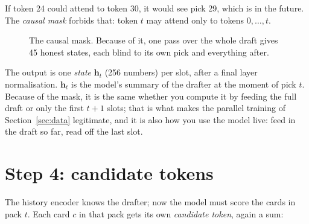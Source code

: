 \documentclass[11pt,letterpaper]{article}
\begin{document}
If token 24 could attend to token 30, it would see pick 29, which is in the future. The \emph{causal
mask} forbids that: token $t$ may attend only to tokens $0,\dots,t$.

\begin{figure}[!htbp]
\centering
{}
\caption{The causal mask. Because of it, one pass over the whole draft gives 45 honest states, each
blind to its own pick and everything after.}
\label{fig:mask}
\end{figure}

The output is one \emph{state} $\mathbf{h}_t$ (256 numbers) per slot, after a final layer normalisation.
$\mathbf{h}_t$ is the model's summary of the drafter at the moment of pick $t$. Because of the mask, it is
the same whether you compute it by feeding the full draft or only the first $t+1$ slots; that is what makes
the parallel training of Section~\ref{sec:data} legitimate, and it is also how you use the model live:
feed in the draft so far, read off the last slot.

\section{Step 4: candidate tokens}

The history encoder knows the drafter; now the model must score the cards in pack $t$. Each card $c$ in
that pack gets its own \emph{candidate token}, again a sum:
\end{document}
